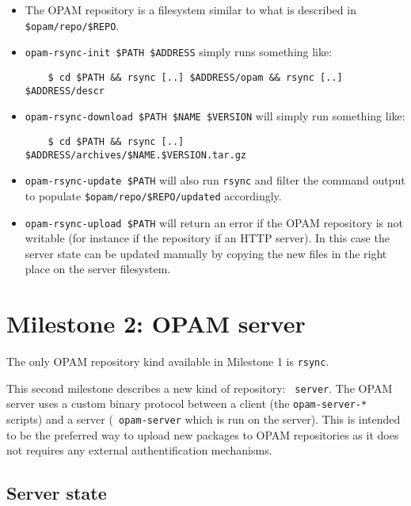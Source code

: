 \documentclass[a4paper,11pt]{article}
\begin{document}
\begin{itemize}

\item The OPAM repository is a filesystem similar to what
  is described in \verb+$opam/repo/$REPO+.

\item \verb+opam-rsync-init $PATH $ADDRESS+ simply runs something like:

\begin{verbatim}
    $ cd $PATH && rsync [..] $ADDRESS/opam && rsync [..] $ADDRESS/descr
\end{verbatim}

\item \verb+opam-rsync-download $PATH $NAME $VERSION+ will simply run
  something like:

\begin{verbatim}
    $ cd $PATH && rsync [..] $ADDRESS/archives/$NAME.$VERSION.tar.gz
\end{verbatim}

\item \verb+opam-rsync-update $PATH+ will also run {\tt rsync} and
  filter the command output to populate
  \verb+$opam/repo/$REPO/updated+ accordingly.

\item \verb+opam-rsync-upload $PATH+ will return an error if the OPAM
  repository is not writable (for instance if the repository if an
  HTTP server). In this case the server state can be updated manually
  by copying the new files in the right place on the server
  filesystem.

\end{itemize}

\section{Milestone 2: OPAM server}
\label{server}

The only OPAM repository kind available in Milestone 1 is {\tt rsync}.

This second milestone describes a new kind of repository: {\tt
  server}. The OPAM server uses a custom binary protocol between a
client (the {\tt opam-server-*} scripts) and a server ({\tt
  opam-server} which is run on the server). This is intended to be the
preferred way to upload new packages to OPAM repositories as it does
not requires any external authentification mechanisms.

\subsection{Server state}
\label{server-state}
\end{document}
